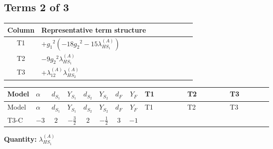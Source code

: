 \documentclass[8pt]{article}
\begin{document}
\begin{landscape}
\subsection*{Terms 2 of 3}
\begin{center}
\begin{tabular}{@{}c >{\raggedright\arraybackslash}p{0.82\linewidth}@{}}
\toprule
Column & Representative term structure \\
\midrule
T1 & \(\displaystyle +{g_1}^2 \left(-18 {g_2}^2-15 {\lambda_{HS_1}^{(A)}}\right)\) \\
\midrule
T2 & \(\displaystyle -9 {g_2}^2 {\lambda_{HS_1}^{(A)}}\) \\
\midrule
T3 & \(\displaystyle +{\lambda_{12}^{(A)}} {\lambda_{HS_2}^{(A)}}\) \\
\midrule
\bottomrule
\end{tabular}
\end{center}
\smallskip
\tiny
\begin{longtable}{@{}llcccccc >{\raggedright\arraybackslash}p{0.21\linewidth} >{\raggedright\arraybackslash}p{0.21\linewidth} >{\raggedright\arraybackslash}p{0.21\linewidth}@{}}
\toprule
Model & $\alpha$ & $d_{S_1}$ & $Y_{S_1}$ & $d_{S_2}$ & $Y_{S_2}$ & $d_F$ & $Y_F$ & T1 & T2 & T3 \\
\midrule
\endfirsthead
\toprule
Model & $\alpha$ & $d_{S_1}$ & $Y_{S_1}$ & $d_{S_2}$ & $Y_{S_2}$ & $d_F$ & $Y_F$ & T1 & T2 & T3 \\
\midrule
\endhead
T3-C & $-3$ & $2$ & $-\frac{3}{2}$ & $2$ & $-\frac{1}{2}$ & $3$ & $-1$ & \scriptsize\adjustbox{max width=\linewidth}{$\begin{gathered} +{g_1}^2 \left(-18 {g_2}^2-15 {\lambda_{HS_1}^{(A)}}\right)\end{gathered}$} & \scriptsize\adjustbox{max width=\linewidth}{$\begin{gathered} -9 {g_2}^2 {\lambda_{HS_1}^{(A)}}\end{gathered}$} & \scriptsize\adjustbox{max width=\linewidth}{$\begin{gathered} +{\lambda_{12}^{(A)}} {\lambda_{HS_2}^{(A)}}\end{gathered}$} \\
\midrule
\bottomrule
\end{longtable}
\clearpage
\noindent\textbf{Quantity: }$\lambda_{HS_1}^{(A)}$\par\smallskip

\end{landscape}
\end{document}
